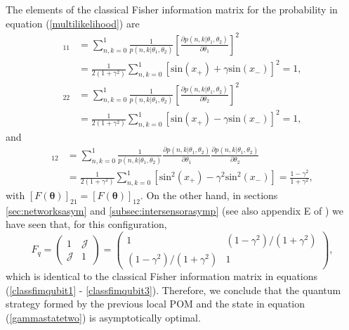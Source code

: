 The elements of the classical Fisher information matrix for the probability in equation (\ref{multilikelihood}) are
\begin{align}
[F(\boldsymbol{\theta})]_{11} &= \sum_{n,k = 0}^1 \frac{1}{p(n, k | \theta_1, \theta_2)}\left[\frac{\partial p(n, k | \theta_1, \theta_2)}{\partial \theta_1} \right]^2 
\nonumber \\
&= \frac{1}{2\left(1+\gamma^2 \right)} \sum_{n,k = 0}^1  \left[ \mathrm{sin}(x_{+}) + \gamma \mathrm{sin}(x_{-}) \right]^2 = 1,
\label{classfimqubit1}
\end{align}
\begin{align}
[F(\boldsymbol{\theta})]_{22} &= \sum_{n,k = 0}^1 \frac{1}{p(n, k | \theta_1, \theta_2)}\left[\frac{\partial p(n, k | \theta_1, \theta_2)}{\partial \theta_2} \right]^2 
\nonumber \\
&= \frac{1}{2\left(1+\gamma^2 \right)} \sum_{n,k = 0}^1 \left[ \mathrm{sin}(x_{+}) - \gamma \mathrm{sin}(x_{-}) \right]^2 = 1,
\end{align}
and
\begin{align}
[F(\boldsymbol{\theta})]_{12} &= \sum_{n,k = 0}^1 \frac{1}{p(n, k | \theta_1, \theta_2)}\frac{\partial p(n, k | \theta_1, \theta_2)}{\partial \theta_1}\frac{\partial p(n, k | \theta_1, \theta_2)}{\partial \theta_2} 
\nonumber \\
&= \frac{1}{2\left(1+\gamma^2 \right)} \sum_{n,k = 0}^1 \left[ \mathrm{sin}^2(x_{+}) - \gamma^2 \mathrm{sin}^2(x_{-})  \right] = \frac{1-\gamma^2}{1+\gamma^2},
\label{classfimqubit3}
\end{align}
with $[F(\boldsymbol{\theta})]_{21}= [F(\boldsymbol{\theta})]_{12}$. On the other hand, in sections \ref{sec:networksasym} and \ref{subsec:intersensorasymp} (see also appendix E of \cite{proctor2017networked}) we have seen that, for this configuration,
\begin{equation}
F_q = 
\begin{pmatrix}
1 & \mathcal{J} \\
\mathcal{J} & 1
\end{pmatrix} =
\begin{pmatrix}
1 & (1-\gamma^2)/(1+\gamma^2) \\
(1-\gamma^2)/(1+\gamma^2) & 1
\end{pmatrix},
\end{equation}
which is identical to the classical Fisher information matrix in equations (\ref{classfimqubit1} - \ref{classfimqubit3}). Therefore, we conclude that the quantum strategy formed by the previous local POM and the state in equation (\ref{gammastatetwo}) is asymptotically optimal. 

